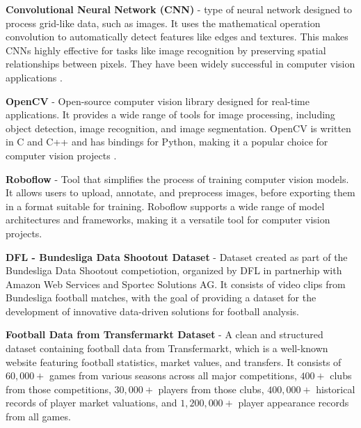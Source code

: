 \documentclass{article}
\begin{document}
\vspace{1em}

\noindent \textbf{Convolutional Neural Network (CNN)} - type of neural network designed to process grid-like data, such as images. It uses the mathematical operation convolution to automatically detect features like edges and textures. This makes CNNs highly effective for tasks like image recognition by preserving spatial relationships between pixels. They have been widely successful in computer vision applications \cite{Ian GoodfellowDeepLearning}.

\vspace{1em}

\noindent \textbf{OpenCV} - Open-source computer vision library designed for real-time applications. It provides a wide range of tools for image processing, including object detection, image recognition, and image segmentation. OpenCV is written in C and C++ and has bindings for Python, making it a popular choice for computer vision projects \cite{OpenCV}.

\vspace{1em}

\noindent \textbf{Roboflow} - Tool that simplifies the process of training computer vision models. It allows users to upload, annotate, and preprocess images, before exporting them in a format suitable for training. Roboflow supports a wide range of model architectures and frameworks, making it a versatile tool for computer vision projects. \cite{Roboflow}

\vspace{1em}

\noindent \textbf{DFL - Bundesliga Data Shootout Dataset} - Dataset created as part of the Bundesliga Data Shootout competiotion, organized by DFL in partnerhip with Amazon Web Services and Sportec Solutions AG. It consists of video clips from Bundesliga football matches, with the goal of providing a dataset for the development of innovative data-driven solutions for football analysis. \cite{DFL Bundesliga Data Shootout}

\vspace{1em}

\noindent \textbf{Football Data from Transfermarkt Dataset} - A clean and structured dataset containing football data from Transfermarkt, which is a well-known website featuring football statistics, market values, and transfers. It consists of \(60{,}000+\) games from various seasons across all major competitions, \(400+\) clubs from those competitions, \(30{,}000+\) players from those clubs, \(400{,}000+\) historical records of player market valuations, and \(1{,}200{,}000+\) player appearance records from all games.\cite{Davidcariboo}
\end{document}
